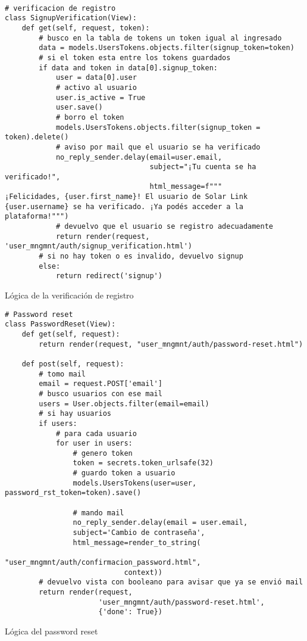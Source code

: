 \begin{listing}[H]
\begin{verbatim}

# verificacion de registro
class SignupVerification(View):
    def get(self, request, token):
        # busco en la tabla de tokens un token igual al ingresado
        data = models.UsersTokens.objects.filter(signup_token=token)
        # si el token esta entre los tokens guardados
        if data and token in data[0].signup_token:
            user = data[0].user
            # activo al usuario
            user.is_active = True
            user.save()
            # borro el token
            models.UsersTokens.objects.filter(signup_token = token).delete()
            # aviso por mail que el usuario se ha verificado
            no_reply_sender.delay(email=user.email, 
                                  subject="¡Tu cuenta se ha verificado!",
                                  html_message=f"""
¡Felicidades, {user.first_name}! El usuario de Solar Link 
{user.username} se ha verificado. ¡Ya podés acceder a la 
plataforma!""")
            # devuelvo que el usuario se registro adecuadamente
            return render(request, 'user_mngmnt/auth/signup_verification.html')
        # si no hay token o es invalido, devuelvo signup
        else:
            return redirect('signup')
\end{verbatim}
\caption{Lógica de la verificación de registro}
\label{signup_verification_user_mngmnt}
\end{listing}

\begin{listing}[H]
\begin{verbatim}
# Password reset
class PasswordReset(View):
    def get(self, request):
        return render(request, "user_mngmnt/auth/password-reset.html")
    
    def post(self, request):
        # tomo mail
        email = request.POST['email']
        # busco usuarios con ese mail
        users = User.objects.filter(email=email)
        # si hay usuarios
        if users:
            # para cada usuario
            for user in users:
                # genero token
                token = secrets.token_urlsafe(32)
                # guardo token a usuario
                models.UsersTokens(user=user, password_rst_token=token).save()

                # mando mail
                no_reply_sender.delay(email = user.email, 
                subject='Cambio de contraseña',
                html_message=render_to_string(
                            "user_mngmnt/auth/confirmacion_password.html",
                            context))
        # devuelvo vista con booleano para avisar que ya se envió mail
        return render(request, 
                      'user_mngmnt/auth/password-reset.html', 
                      {'done': True})
\end{verbatim}
\caption{Lógica del password reset}
\label{password_reset_user_mngmnt}
\end{listing}

